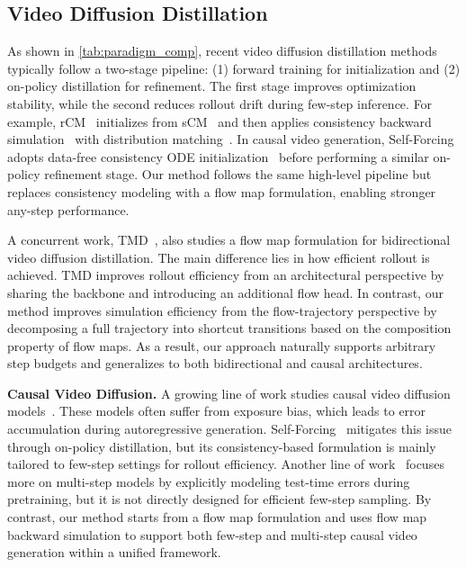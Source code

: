 \documentclass{llmxive}
\providecommand{\myPara}[1]{\noindent\textbf{#1}}
\begin{document}
\subsection{Video Diffusion Distillation}
As shown in \cref{tab:paradigm_comp}, recent video diffusion distillation methods typically follow a two-stage pipeline: (1) forward training for initialization and (2) on-policy distillation for refinement. The first stage improves optimization stability, while the second reduces rollout drift during few-step inference. For example, rCM~\cite{zheng2025large} initializes from sCM~\cite{lu2024simplifying} and then applies consistency backward simulation~\cite{yin2024improved} with distribution matching~\cite{yin2024one}. In causal video generation, Self-Forcing~\cite{huang2025selfforcing} adopts data-free consistency ODE initialization~\cite{yin2025causvid} before performing a similar on-policy refinement stage. Our method follows the same high-level pipeline but replaces consistency modeling with
a flow map formulation, enabling stronger any-step performance.

A concurrent work, TMD~\cite{nie2026transition}, also studies a flow map formulation for bidirectional video diffusion distillation. The main difference lies in how efficient rollout is achieved. TMD improves rollout efficiency from an architectural perspective by sharing the backbone and introducing an additional flow head. In contrast, our method improves simulation efficiency from the flow-trajectory perspective by decomposing a full trajectory into shortcut transitions based on the composition property of flow maps. As a result, our approach naturally supports arbitrary step budgets and generalizes to both bidirectional and causal architectures.

\myPara{Causal Video Diffusion.} A growing line of work studies causal video diffusion models~\cite{yang2025longlive, jinpyramidal,zhang2025framepack,songhistory}. These models often suffer from exposure bias, which leads to error accumulation during autoregressive generation. Self-Forcing~\cite{huang2025selfforcing} mitigates this issue through on-policy distillation, but its consistency-based formulation is mainly tailored to few-step settings for rollout efficiency. Another line of work~\cite{guo2025end} focuses more on multi-step models by explicitly modeling test-time errors during pretraining, but it is not directly designed for efficient few-step sampling. By contrast, our method starts from a flow map formulation and uses flow map backward simulation to support both few-step and multi-step causal video generation within a unified framework.
\end{document}
